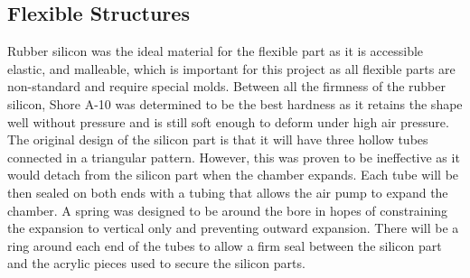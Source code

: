 \documentclass[twoside]{article}
\begin{document}
\subsection{Flexible Structures}
Rubber silicon was the ideal material for the flexible part as it is accessible elastic, and malleable, which is important for this project as all flexible parts are non-standard and require special molds. Between all the firmness of the rubber silicon, Shore A-10 was determined to be the best hardness as it retains the shape well without pressure and is still soft enough to deform under high air pressure. The original design of the silicon part is that it will have three hollow tubes connected in a triangular pattern. However, this was proven to be ineffective as it would detach from the silicon part when the chamber expands. Each tube will be then sealed on both ends with a tubing that allows the air pump to expand the chamber. A spring was designed to be around the bore in hopes of constraining the expansion to vertical only and preventing outward expansion. There will be a ring around each end of the tubes to allow a firm seal between the silicon part and the acrylic pieces used to secure the silicon parts.  
\end{document}
